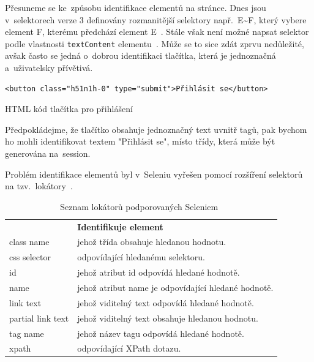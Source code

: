 \documentclass[12pt, a4paper, twoside]{article}
\newcommand{\codefigureSpacing}{1.2}
\begin{document}
	\noindent Přesuneme se ke~způsobu identifikace elementů na stránce. Dnes jsou v~selektorech verze 3 definovány rozmanitější selektory např.~E\textasciitilde F, který vybere element F, kterému předchází element E~\cite{selectors3W3c}. Stále však není možné napsat selektor podle vlastnosti \texttt{textContent} elementu~\cite{selectors4W3c}. Může se to sice zdát zprvu nedůležité, avšak často se jedná o~dobrou identifikaci tlačítka, která je jednoznačná a~uživatelsky přívětivá.
	\begin{codefigure}[H]
		\renewcommand\baselinestretch{\codefigureSpacing}
		\begin{lstlisting}[style=MyHTML]
<button class="h51n1h-0" type="submit">Přihlásit se</button>
		\end{lstlisting}
		\caption{HTML kód tlačítka pro přihlášení}
		\label{codefig:loginButton}
	\end{codefigure}
	Předpokládejme, že tlačítko obsahuje jednoznačný text uvnitř tagů, pak bychom ho mohli identifikovat textem "Přihlásit se", místo třídy, která může být generována na~session.
	
	\newpage
	Problém identifikace elementů byl v~Seleniu vyřešen pomocí rozšíření selektorů na tzv.~lokátory~\cite{seleniumDocs}.
	{
	\begin{table}[H]
		\centering
	\begin{tabular}{ l|l }
	\rowcolor{tableHeadingBackground} \multicolumn{1}{l}{\textbf{Lokátor}} & \multicolumn{1}{l}{\textbf{Identifikuje element}} \\
	class name &  jehož třída obsahuje hledanou hodnotu.\\ 
	css selector & odpovídající hledanému selektoru. \\ 
	id & jehož atribut id odpovídá hledané hodnotě. \\
	name & jehož atribut name je odpovídající hledané hodnotě. \\
	link text & jehož viditelný text odpovídá hledané hodnotě. \\
	partial link text & jehož viditelný text obsahuje hledanou hodnotu.  \\
	tag name & jehož název tagu odpovídá hledané hodnotě. \\
	xpath & odpovídající XPath dotazu. \\
	\end{tabular}
	\caption{Seznam lokátorů podporovaných Seleniem~\cite{seleniumDocs}}
	\label{tab:locatorsList}
	\end{table}
	}
\end{document}

